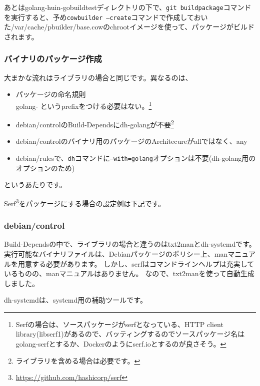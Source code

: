 \documentclass[mingoth,a4paper]{jsarticle}
\begin{document}
あとはgolang-huin-gobuildtestディレクトリの下で、\texttt{git buildpackage}コマンドを実行すると、予め\texttt{cowbuilder --create}コマンドで作成しておいた/var/cache/pbuilder/base.cowのchrootイメージを使って、パッケージがビルドされます。

\subsubsection{バイナリのパッケージ作成}

大まかな流れはライブラリの場合と同じです。異なるのは、

\begin{itemize}
\item パッケージの命名規則 \\
  golang- というprefixをつける必要はない。\footnote{Serfの場合は、ソースパッケージがserfとなっている、HTTP client library(libserf1)があるので、バッティングするのでソースパッケージ名はgolang-serfとするか、Dockerのようにserf.ioとするのが良さそう。}
\item debian/controlのBuild-Dependsにdh-golangが不要\footnote{ライブラリを含める場合は必要です。}
\item debian/controlのバイナリ用のパッケージのArchitecureがallではなく、any
\item debian/rulesで、\texttt{dh}コマンドに\texttt{--with=golang}オプションは不要(dh-golang用のオプションのため)
\end{itemize}

というあたりです。

Serf\footnote{\url{https://github.com/hashicorp/serf}}をパッケージにする場合の設定例は下記です。

\subsubsection{debian/control}

Build-Dependsの中で、ライブラリの場合と違うのはtxt2manとdh-systemdです。
実行可能なバイナリファイルは、Debianパッケージのポリシー上、manマニュアルを用意する必要があります。
しかし、serfはコマンドラインヘルプは充実しているものの、manマニュアルはありません。
なので、txt2manを使って自動生成しました。

dh-systemdは、systemd用の補助ツールです。
\end{document}
